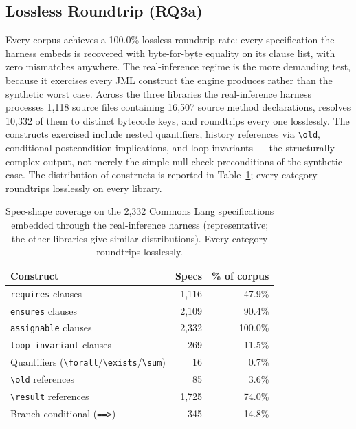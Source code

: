 \subsection{Lossless Roundtrip (RQ3a)}

Every corpus achieves a 100.0\% lossless-roundtrip rate: every specification the
harness embeds is recovered with byte-for-byte equality on its clause list, with
zero mismatches anywhere. The real-inference regime is the more demanding test,
because it exercises every JML construct the engine produces rather than the
synthetic worst case. Across the three libraries the real-inference harness
processes 1{,}118 source files containing 16{,}507 source method declarations,
resolves 10{,}332 of them to distinct bytecode keys, and roundtrips every one
losslessly. The constructs exercised include nested quantifiers, history
references via \texttt{\textbackslash old}, conditional postcondition
implications, and loop invariants --- the structurally complex output, not
merely the simple null-check preconditions of the synthetic case. The
distribution of constructs is reported in Table~\ref{tab:dist-shapes}; every
category roundtrips losslessly on every library.

\begin{table}[ht]
\centering
\caption{Spec-shape coverage on the 2{,}332 Commons Lang specifications embedded
through the real-inference harness (representative; the other libraries give
similar distributions). Every category roundtrips losslessly.}
\label{tab:dist-shapes}
\begin{tabular}{lrr}
\toprule
\textbf{Construct} & \textbf{Specs} & \textbf{\% of corpus} \\
\midrule
\texttt{requires} clauses               & 1{,}116 & 47.9\% \\
\texttt{ensures} clauses                & 2{,}109 & 90.4\% \\
\texttt{assignable} clauses             & 2{,}332 & 100.0\% \\
\texttt{loop\_invariant} clauses        & 269 & 11.5\% \\
Quantifiers (\texttt{\textbackslash forall}/\texttt{\textbackslash exists}/\texttt{\textbackslash sum}) & 16 & 0.7\% \\
\texttt{\textbackslash old} references  & 85 & 3.6\% \\
\texttt{\textbackslash result} references & 1{,}725 & 74.0\% \\
Branch-conditional (\texttt{==>})       & 345 & 14.8\% \\
\bottomrule
\end{tabular}
\end{table}

